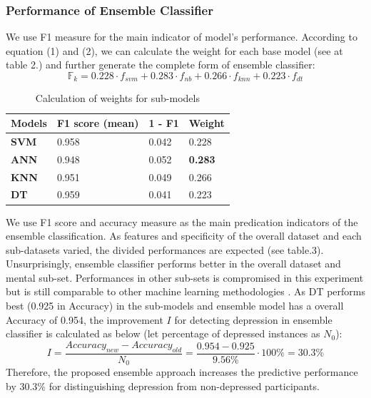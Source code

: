\documentclass[12pt]{article}
\begin{document}
\subsubsection{Performance of Ensemble Classifier}
We use F1 measure for the main indicator of model's performance. According to equation (1) and (2), we can calculate the weight for each base model (see at table 2.) and further generate the complete form of ensemble classifier:
\begin{equation}
\mathbb{F}_{k} = 0.228 \cdot f_{svm} + 0.283 \cdot f_{nb} + 0.266 \cdot f_{knn} + 0.223 \cdot f_{dt}
\end{equation}
\begin{table}[ht]
\begin{tabular}{|C{3cm}|C{3cm}|C{3cm}|C{3cm}|}
\hline
{} 
{\color[HTML]{333333} \textbf{Models}} & {\color[HTML]{333333} \textbf{F1 score (mean)}} & {\color[HTML]{333333} \textbf{1 - F1}} & {\color[HTML]{333333} \textbf{Weight}} \\ \hline
{} 
\textbf{SVM}& 0.958  & 0.042  & 0.228 \\ \hline
{} 
\textbf{ANN} & 0.948  & 0.052   & \textbf{0.283}    \\ \hline
{} 
\textbf{KNN} & 0.951   & 0.049  & 0.266 \\ \hline
{} 
\textbf{DT}  & 0.959  & 0.041  & 0.223  \\ \hline
\end{tabular}
\caption{Calculation of weights for sub-models}
\label{weight}
\end{table}

We use F1 score and accuracy measure as the main predication indicators of the ensemble classification. As features and specificity of the overall dataset and each sub-datasets varied, the divided performances are expected (see table.3). Unsurprisingly, ensemble classifier performs better in the overall dataset and mental sub-set. Performances in other sub-sets is compromised in this experiment but is still comparable to other machine learning methodologies \cite{Fatima}\cite{Hassan}\cite{Peng}\cite{Reece}. As DT performs best (0.925 in Accuracy) in the sub-models and ensemble model has a overall Accuracy of 0.954, the improvement $I$ for detecting depression in ensemble classifier is calculated as below (let percentage of depressed instances as $N_{0}$):\\
\begin{equation}\label{reio}
	 I = \frac{Accuracy_{new} - Accuracy_{old}}{N_{0}} = \frac{0.954 - 0.925}{9.56\%} \cdot 100\% = 30.3\%
\end{equation}
Therefore, the proposed ensemble approach increases the predictive performance by 30.3\% for distinguishing depression from non-depressed participants.
\end{document}
